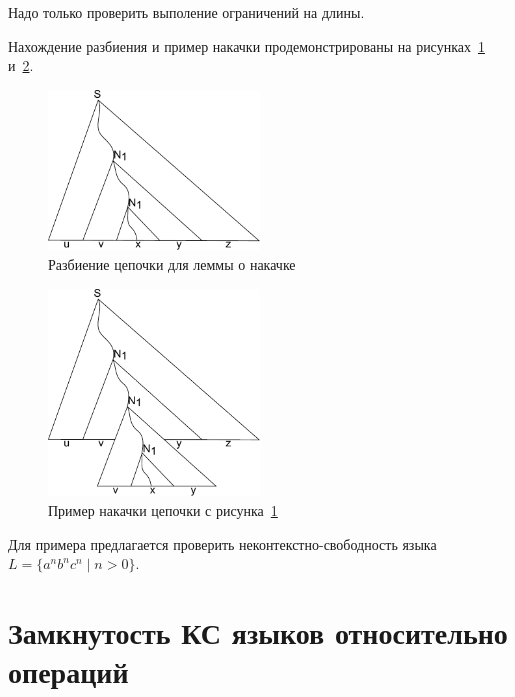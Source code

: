 Надо только проверить выполение ограничений на длины.

Нахождение разбиения и пример накачки продемонстрированы на рисунках~\ref{fig:pumping1} и~\ref{fig:pumping2}.

\begin{figure}
\centering
\includegraphics[width=0.5\textwidth]{pics/pumping_tree_1.pdf}
\caption{Разбиение цепочки для леммы о накачке}
\label{fig:pumping1}
\end{figure}

\begin{figure}
\centering
\includegraphics[width=0.5\textwidth]{pics/pumping_tree_2.pdf}
\caption{Пример накачки цепочки с рисунка~\ref{fig:pumping1}}
\label{fig:pumping2}
\end{figure}


Для примера предлагается проверить неконтекстно-свободность языка $L=\{a^nb^nc^n \mid n>0\}$.


\section{Замкнутость КС языков относительно операций}


